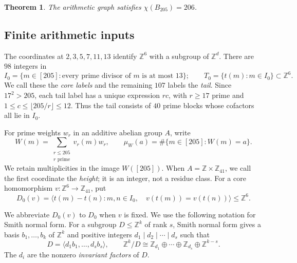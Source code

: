 \documentclass[11pt,reqno]{amsart}
\newcommand{\Z}{\mathbb Z}
\newtheorem{theorem}{Theorem}[section]
\theoremstyle{definition}
\theoremstyle{remark}
\numberwithin{equation}{section}
\begin{document}
\begin{theorem}\label{thm:205}
The arithmetic graph satisfies $\chi(B_{205})=206$.
\end{theorem}

\subsection{Finite arithmetic inputs}\label{sec:finite-inputs}

The coordinates at $2,3,5,7,11,13$ identify $\Z^6$ with a subgroup of $\Z^d$.
There are $98$ integers in
\[
 I_0=\{m\in[205]:\text{every prime divisor of }m\text{ is at most }13\};
 \qquad T_0=\{t(m):m\in I_0\}\subset\Z^6.
\]
We call these the \emph{core labels} and the remaining $107$ labels the
\emph{tail}. Since $17^2>205$, each tail label has a unique expression
$rc$, with $r\ge17$ prime and $1\le c\le\lfloor205/r\rfloor\le12$.
Thus the tail consists of $40$ prime blocks whose cofactors all lie in $I_0$.

For prime weights $w_r$ in an additive abelian group $A$, write
\[
 W(m)=\sum_{\substack{r\le205\\ r\text{ prime}}}v_r(m)w_r,
 \qquad \mu_W(a)=\#\{m\in[205]:W(m)=a\}.
\]
We retain multiplicities in the image $W([205])$. When
$A=\Z\times\Z_{41}$, we call the first coordinate the \emph{height};
it is an integer, not a residue class.
For a core homomorphism $v:\Z^6\to\Z_{41}$, put
\[
 D_0(v)=\big\langle t(m)-t(n):m,n\in I_0,\quad
                 v(t(m))=v(t(n))\big\rangle\le\Z^6.
\]

We abbreviate $D_0(v)$ to $D_0$ when $v$ is fixed.
We use the following notation for Smith normal form.
For a subgroup $D\le\Z^k$ of rank $s$, Smith normal form gives a
basis $b_1,\ldots,b_k$ of $\Z^k$ and positive integers
$d_1\mid d_2\mid\cdots\mid d_s$ such that
\[
 D=\langle d_1b_1,\ldots,d_sb_s\rangle,
 \qquad \Z^k/D\cong\Z_{d_1}\oplus\cdots\oplus\Z_{d_s}\oplus\Z^{k-s}.
\]
The $d_i$ are the nonzero \emph{invariant factors} of $D$.
\end{document}
